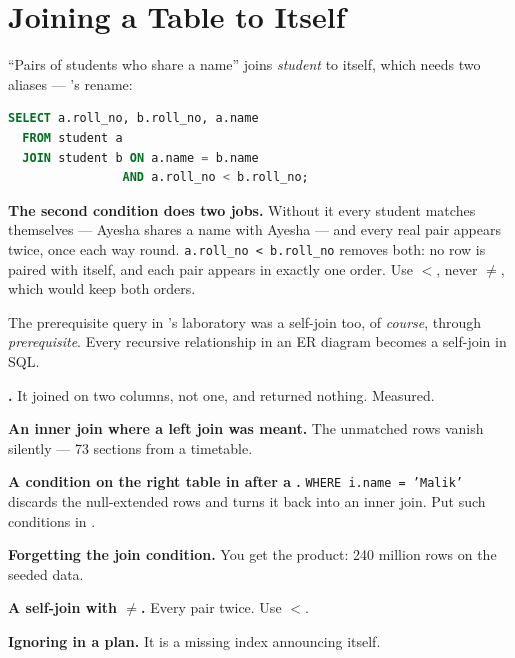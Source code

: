 \section{Joining a Table to Itself}

\begin{examplebox}
``Pairs of students who share a name'' joins \textit{student} to itself, which
needs two aliases --- 's rename:

\begin{lstlisting}[language=sql]
SELECT a.roll_no, b.roll_no, a.name
  FROM student a
  JOIN student b ON a.name = b.name
                AND a.roll_no < b.roll_no;
\end{lstlisting}

\smallskip
\textbf{The second condition does two jobs.} Without it every student matches
themselves --- Ayesha shares a name with Ayesha --- and every real pair appears
twice, once each way round. \texttt{a.roll\_no < b.roll\_no} removes both: no
row is paired with itself, and each pair appears in exactly one order. Use
$<$, never $\neq$, which would keep both orders.

\smallskip
The prerequisite query in 's laboratory was a self-join too, of
\textit{course}, through \textit{prerequisite}. Every recursive relationship in
an ER diagram becomes a self-join in SQL.
\end{examplebox}

\begin{pitfall}
\begin{tight}
  \item \textbf{.} It joined on two columns, not one, and
        returned nothing. Measured.
  \item \textbf{An inner join where a left join was meant.} The unmatched rows
        vanish silently --- 73 sections from a timetable.
  \item \textbf{A condition on the right table in  after a
        .} \texttt{WHERE i.name = 'Malik'} discards the
        null-extended rows and turns it back into an inner join. Put such
        conditions in .
  \item \textbf{Forgetting the join condition.} You get the product: 240
        million rows on the seeded data.
  \item \textbf{A self-join with $\neq$.} Every pair twice. Use $<$.
  \item \textbf{Ignoring  in a plan.} It is a missing
        index announcing itself.
\end{tight}
\end{pitfall}

